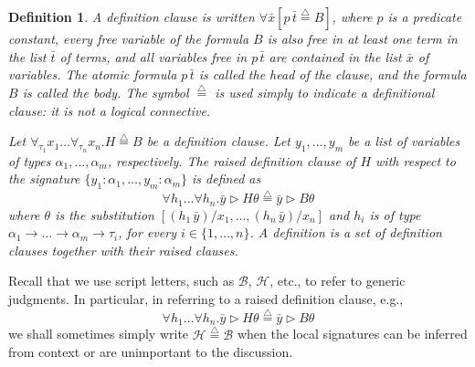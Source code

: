 \documentclass{acmtrans2m}
\newenvironment{definition}{\begin{define} \rm}{\end{define}}
\newtheorem{define}[theorem]{Definition}
\def\Bscr{{\mathcal B}}
\def\Hscr{{\mathcal H}}
\newcommand{\Judg}[2]{#1\triangleright#2}
\newcommand{\defeq}{\mathrel{\stackrel{{\scriptscriptstyle\triangle}}{=}}}
\newcommand{\ra}{\rightarrow}
\begin{document}
\begin{definition}
\label{def:def}
A {\em definition clause} is written 
$\forall \bar x [p \, \bar{t} \defeq B]$, 
where $p$ is a predicate constant, every free variable of
the formula $B$ is also free in at least one term in the list
$\bar{t}$ of terms, and all variables free in $p\,\bar{t}$ are
contained in the list $\bar{x}$ of variables.  The atomic formula $p
\, \bar{t}$ is called the {\em head} of the clause, and the formula
$B$ is called the {\em body}.  The symbol $\defeq$ is used simply to
indicate a definitional clause: it is not a logical connective.  

Let $\forall_{\tau_1} x_1\ldots \forall_{\tau_n} x_n.H \defeq B$ be a
definition clause. Let $y_1, \ldots, y_m$ be a list of variables of types
$\alpha_1,\ldots,\alpha_m$, respectively. 
The {\em raised definition clause} of $H$ with respect to the signature
$\{y_1:\alpha_1,\ldots,y_m:\alpha_m\}$ is defined as
$$
\forall h_1\ldots \forall h_n.\Judg{\bar{y}}{H\theta}
\defeq \Judg{\bar{y}}{B\theta}
$$
where $\theta$ is the substitution
$[(h_1\,\bar{y})/x_1,\ldots,(h_n\,\bar{y})/x_n]$ and 
$h_i$ is of type
$\alpha_1 \ra \ldots \ra \alpha_m \ra \tau_i$, for every
$i\in\{1,\ldots,n\}$. 
A {\em definition} is a set of definition clauses
together with their raised clauses.
\end{definition}

Recall that we use script letters, such as $\Bscr$, $\Hscr$, etc., 
to refer to generic judgments. In particular, in referring to a raised definition clause, e.g., 
$$
\forall h_1\ldots \forall h_n.\Judg{\bar{y}}{H\theta}
\defeq \Judg{\bar{y}}{B\theta}
$$
we shall sometimes simply write $\Hscr \defeq \Bscr$ when the 
local signatures can be inferred from context or are unimportant to the discussion.
\end{document}
